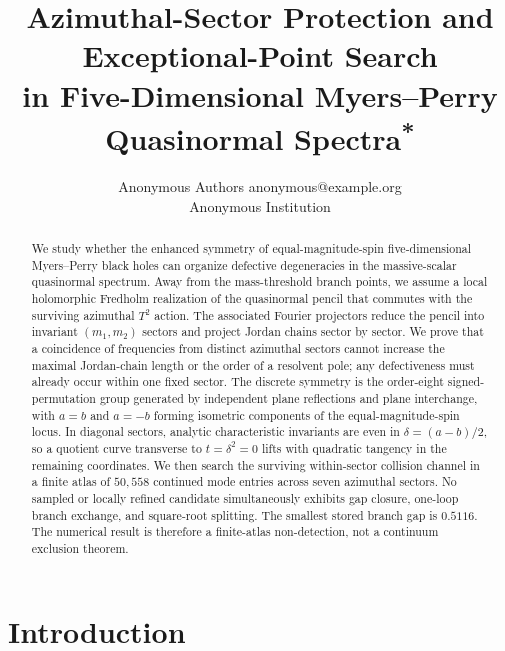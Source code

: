 \documentclass[10pt]{article}
\title{Azimuthal-Sector Protection and Exceptional-Point Search\\
in Five-Dimensional Myers--Perry Quasinormal
Spectra\texorpdfstring{\textsuperscript{*}}{}}
\author{\name Anonymous Authors \email anonymous@example.org \\
        \addr Anonymous Institution}
\theoremstyle{plain}
\begin{document}
\maketitle

\renewcommand{\thefootnote}{\fnsymbol{footnote}}
\renewcommand{\thefootnote}{\arabic{footnote}}
\setcounter{footnote}{0}

\begin{abstract}
We study whether the enhanced symmetry of equal-magnitude-spin five-dimensional
Myers--Perry black holes can organize defective degeneracies in the
massive-scalar quasinormal spectrum. Away from the mass-threshold branch
points, we assume a local holomorphic Fredholm realization of the quasinormal
pencil that commutes with the surviving azimuthal $T^2$ action. The associated
Fourier projectors reduce the pencil into invariant $(m_1,m_2)$ sectors and
project Jordan chains sector by sector. We prove that a coincidence of
frequencies from distinct azimuthal sectors cannot increase the maximal
Jordan-chain length or the order of a resolvent pole; any defectiveness must
already occur within one fixed sector. The discrete symmetry is the order-eight
signed-permutation group generated by independent plane reflections and plane
interchange, with $a=b$ and $a=-b$ forming isometric components of the
equal-magnitude-spin locus. In diagonal sectors, analytic characteristic
invariants are even in $\delta=(a-b)/2$, so a quotient curve transverse to
$t=\delta^2=0$ lifts with quadratic tangency in the remaining coordinates. We
then search the surviving within-sector collision channel in a finite atlas of
$50{,}558$ continued mode entries across seven azimuthal sectors. No sampled or
locally refined candidate simultaneously exhibits gap closure, one-loop branch
exchange, and square-root splitting. The smallest stored branch gap is
$0.5116$. The numerical result is therefore a finite-atlas non-detection, not a
continuum exclusion theorem.
\end{abstract}

\section{Introduction}
\end{document}

